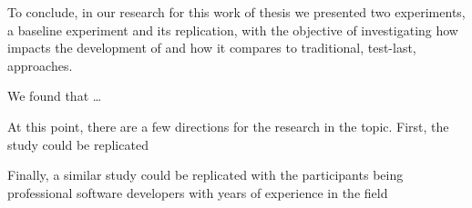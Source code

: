 To conclude, in our research for this work of thesis we presented two experiments, a baseline experiment and its replication, with the objective of investigating how \tdd impacts the development of \ess and how it compares to traditional, test-last, approaches.

We found that \dots

At this point, there are a few directions for the research in the topic. First, the study could be replicated 


Finally, a similar study could be replicated with the participants being professional software developers with years of experience in the \es field